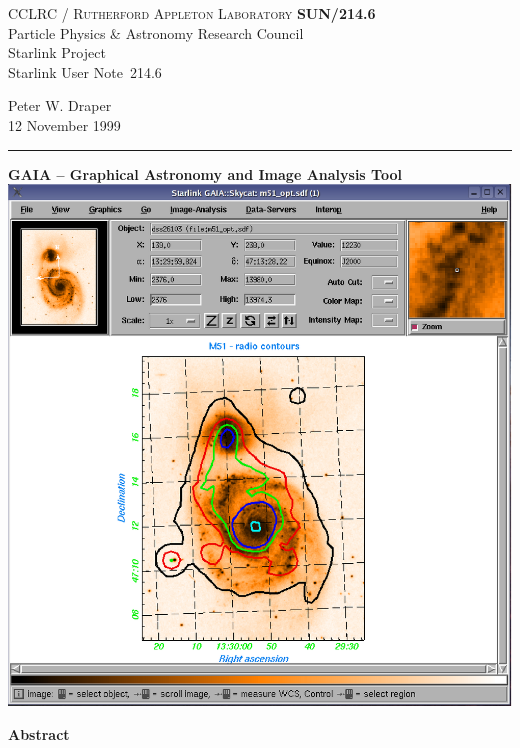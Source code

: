 \documentclass[twoside,11pt]{article}
\newcommand{\stardoccategory}  {Starlink User Note}
\newcommand{\stardocinitials}  {SUN}
\newcommand{\stardocnumber}    {214.6}
\newcommand{\stardocauthors}   {Peter W. Draper}
\newcommand{\stardocdate}      {12 November 1999}
\newcommand{\stardoctitle}     {GAIA -- Graphical Astronomy and
                                Image Analysis Tool}
\newcommand{\stardocname}{\stardocinitials /\stardocnumber}
\newenvironment{latexonly}{}{}
\renewcommand{\_}{\texttt{\symbol{95}}}
\begin{document}
\thispagestyle{empty}

\begin{latexonly}
   CCLRC / \textsc{Rutherford Appleton Laboratory} \hfill \textbf{\stardocname}\\
   {\large Particle Physics \& Astronomy Research Council}\\
   {\large Starlink Project\\}
   {\large \stardoccategory\ \stardocnumber}
   \begin{flushright}
   \stardocauthors\\
   \stardocdate
   \end{flushright}
   \vspace{-4mm}
   \rule{\textwidth}{0.5mm}
   \vspace{5mm}
   \begin{center}
   {\Large\textbf{\stardoctitle \\ [2.5ex]}}
   \vspace{5mm}
   \includegraphics[totalheight=5in]{sun214fig.ps}
   \end{center}

   \begin{center}
      {\Large\textbf{Abstract}}
   \end{center}
\end{latexonly}
\end{document}
